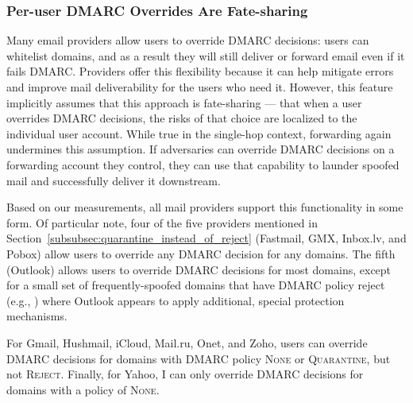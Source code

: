 \subsubsection{Per-user DMARC Overrides Are Fate-sharing}
\label{subsubsec:whitelist}
Many email providers allow users to override DMARC decisions: users can whitelist domains, and as a result they will still deliver or forward email even if it fails DMARC.
Providers offer this flexibility because it can help mitigate
errors and improve mail deliverability for the users who need it.
However, this feature implicitly assumes that this approach is
fate-sharing --- that when a user overrides DMARC decisions, the risks
of that choice are localized to the individual user account.  While
true in the single-hop context, forwarding again undermines this
assumption.  If adversaries can override DMARC decisions on a
forwarding account they control, they can use that capability to
launder spoofed mail and successfully deliver it downstream.


Based on our measurements, all mail providers support this functionality in some form.
Of particular note, four of the five providers 
mentioned in Section~\ref{subsubsec:quarantine_instead_of_reject}
(Fastmail, GMX, Inbox.lv, and Pobox)
allow users to override any DMARC decision for any domains.
The fifth (Outlook) allows users to override DMARC decisions for most domains, except for a small set of frequently-spoofed domains that have DMARC policy reject (e.g., ) where Outlook appears to apply additional, special protection mechanisms.

For Gmail, Hushmail, iCloud, Mail.ru, Onet, and Zoho, users can override DMARC decisions for domains with DMARC policy \textsc{None} or \textsc{Quarantine}, but not \textsc{Reject}.  Finally, for Yahoo, I can only override DMARC decisions for domains with a policy of \textsc{None}.


